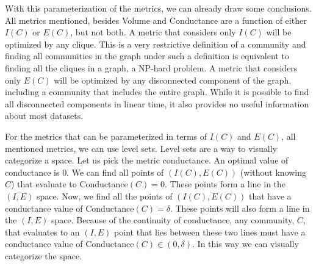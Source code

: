 \documentclass[phd,tocprelim]{cornell}
\begin{document}
 With this parameterization of the metrics, we can already draw some conclusions.  All metrics mentioned, besides {\sc Volume} and {\sc Conductance} are a function of either $I(C)$ or $E(C)$, but not both.  A metric that considers only $I(C)$ will be optimized by any clique.  This is a very restrictive definition of a community and finding all communities in the graph under such a definition is equivalent to finding all the cliques in a graph, a NP-hard problem.  A metric that considers only $E(C)$ will be optimized by any disconnected component of the graph, including a community that includes the entire graph.  While it is possible to find all disconnected components in linear time, it also provides no useful information about most datasets.

For the metrics that can be parameterized in terms of $I(C)$ and $E(C)$, all mentioned metrics, we can use level sets.  Level sets are a way to visually categorize a space.  Let us pick the metric conductance.  An optimal value of conductance is $0$.  We can find all points of $(I(C), E(C))$ (without knowing $C$) that evaluate to {\sc Conductance}$(C) = 0$.  These points form a line in the $(I, E)$ space.  Now, we find all the points of $(I(C), E(C))$ that have a conductance value of {\sc Conductance}$(C) = \delta$.  These points will also form a line in the $(I, E)$ space.  Because of the continuity of conductance, any community, $C$, that evaluates to an $(I, E)$ point that lies between these two lines must have a conductance value of {\sc Conductance}$(C) \in (0, \delta)$.  In this way we can visually categorize the space.
\end{document}
